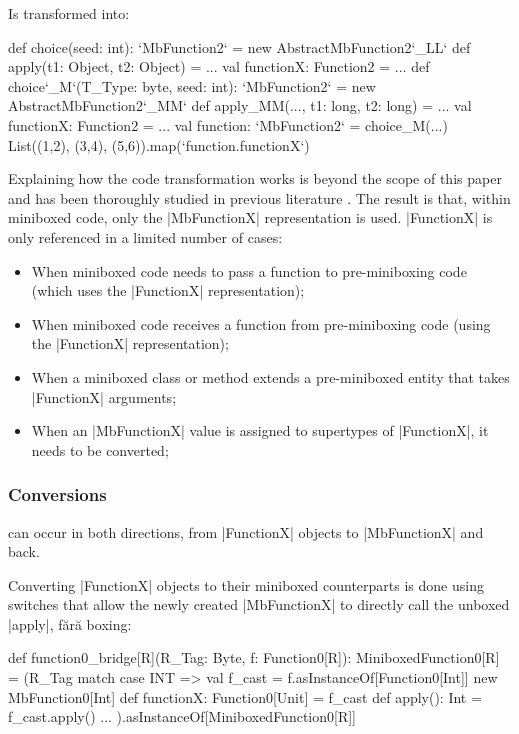 Is transformed into:

\begin{lstlisting-nobreak}
 def choice(seed: int): `MbFunction2` =
   new AbstractMbFunction2`_LL` {
     def apply(t1: Object, t2: Object) = ...
     val functionX: Function2 = ...
   }
 def choice`_M`(T_Type: byte, seed: int): `MbFunction2` =
   new AbstractMbFunction2`_MM` {
     def apply_MM(..., t1: long, t2: long) = ...
     val functionX: Function2 = ...
   }
 val function: `MbFunction2` = choice_M(...)
 List((1,2), (3,4), (5,6)).map(`function.functionX`)
\end{lstlisting-nobreak}

Explaining how the code transformation works is beyond the scope of this paper and has been thoroughly studied in previous literature \cite{ldl,ildl-tech}. The result is that, within miniboxed code, only the |MbFunctionX| representation is used. |FunctionX| is only referenced in a limited number of cases:
\begin{itemize}
  \item When miniboxed code needs to pass a function to pre-miniboxing code (which uses the |FunctionX| representation);
  \item When miniboxed code receives a function from pre-miniboxing code (using the |FunctionX| representation);
  \item When a miniboxed class or method extends a pre-miniboxed entity that takes |FunctionX| arguments;
  \item When an |MbFunctionX| value is assigned to supertypes of |FunctionX|, it needs to be converted;
\end{itemize}

\subsubsection*{Conversions} can occur in both directions, from |FunctionX| objects to |MbFunctionX| and back.

Converting |FunctionX| objects to their miniboxed counterparts is done using switches that allow the newly created |MbFunctionX| to directly call the unboxed |apply|, fără boxing:

\begin{lstlisting-nobreak}
 def function0_bridge[R](R_Tag: Byte, f: Function0[R]): MiniboxedFunction0[R] =
   (R_Tag match {
     case INT =>
       val f_cast = f.asInstanceOf[Function0[Int]]
       new MbFunction0[Int] {
         def functionX: Function0[Unit] = f_cast
         def apply(): Int = f_cast.apply()
       }
     ...
   }).asInstanceOf[MiniboxedFunction0[R]]
\end{lstlisting-nobreak}

